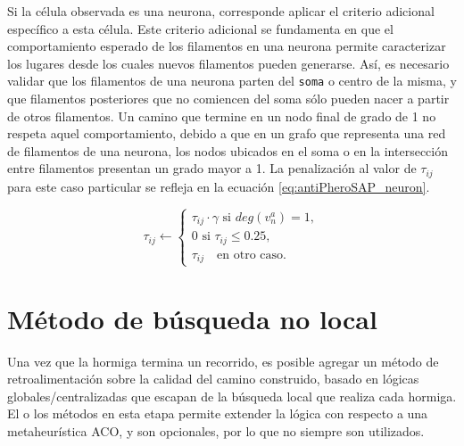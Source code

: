 Si la c\'elula observada es una neurona, corresponde aplicar el criterio adicional espec\'ifico a esta c\'elula. Este criterio adicional se fundamenta en que el comportamiento esperado de los filamentos en una neurona permite caracterizar los lugares desde los cuales nuevos filamentos pueden generarse. As\'i, es necesario validar que los filamentos de una neurona parten del {\tt soma} o centro de la misma, y que filamentos posteriores que no comiencen del soma s\'olo pueden nacer a partir de otros filamentos. Un camino que termine en un nodo final de grado de 1 no respeta aquel comportamiento, debido a que en un grafo que representa una red de filamentos de una neurona, los nodos ubicados en el soma o en la intersecci\'on entre filamentos presentan un grado mayor a 1. La penalizaci\'on al valor de $\tau_{ij}$ para este caso particular se refleja en la ecuaci\'on \ref{eq:antiPheroSAP_neuron}.

\begin{equation}
    \tau_{ij} \leftarrow
        \begin{cases}
         \tau_{ij} \cdot \gamma \text{ si } deg(v^{a}_{n}) = 1,  \\[3ex]
        
        \text{0 si } \tau_{ij} \leq 0.25, \\[3ex]
        \tau_{ij} \quad \text{en otro caso}.
        \end{cases}
    \label{eq:antiPheroSAP_neuron}
\end{equation}




\section{M\'etodo de b\'usqueda no local}
Una vez que la hormiga termina un recorrido, es posible agregar un m\'etodo de retroalimentaci\'on sobre la calidad del camino construido, basado en l\'ogicas globales/centralizadas que escapan de la b\'usqueda local que realiza cada hormiga. El o los m\'etodos en esta etapa permite extender la l\'ogica con respecto a una metaheur\'istica ACO, y son opcionales, por lo que no siempre son utilizados. 

